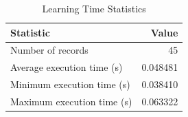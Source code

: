 
\begin{table}[h!]
\centering
\begin{tabular}{l r}
\hline
Statistic & Value \\
\hline
Number of records & 45 \\
Average execution time (s) & 0.048481 \\
Minimum execution time (s) & 0.038410 \\
Maximum execution time (s) & 0.063322 \\
\hline
\end{tabular}
\caption{Learning Time Statistics}
\end{table}
